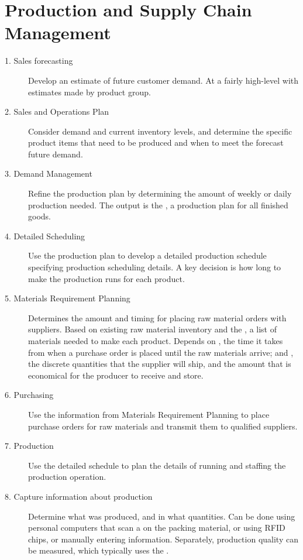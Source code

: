 \documentclass[\main/notes.tex]{subfiles}
\begin{document}
		\section{Production and Supply Chain Management}
			\begin{description}
				\item[1. Sales forecasting] Develop an estimate of future customer demand. At a fairly high-level with estimates made by product group.
				\item[2. Sales and Operations Plan] Consider demand and current inventory levels, and determine the specific product items that need to be produced and when to meet the forecast future demand.
				\item[3. Demand Management] Refine the production plan by determining the amount of weekly or daily production needed. The output is the , a production plan for all finished goods.
				\item[4. Detailed Scheduling] Use the production plan to develop a detailed production schedule specifying production scheduling details. A key decision is how long to make the production runs for each product.
				\item[5. Materials Requirement Planning] Determines the amount and timing for placing raw material orders with suppliers. Based on existing raw material inventory and the , a list of materials needed to make each product. Depends on , the time it takes from when a purchase order is placed until the raw materials arrive; and , the discrete quantities that the supplier will ship, and the amount that is economical for the producer to receive and store.
				\item[6. Purchasing] Use the information from Materials Requirement Planning to place purchase orders for raw materials and transmit them to qualified suppliers.
				\item[7. Production] Use the detailed schedule to plan the details of running and staffing the production operation.
				\item[8. Capture information about production] Determine what was produced, and in what quantities. Can be done using personal computers that scan a  on the packing material, or using RFID chips, or manually entering information. Separately, production quality can be measured, which typically uses the .
			\end{description}
	\vbox{}
\end{document}
